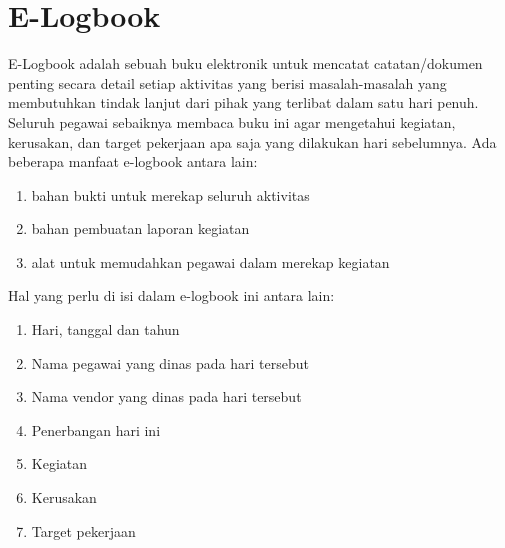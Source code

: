 \section{E-Logbook}
E-Logbook adalah sebuah buku elektronik untuk mencatat catatan/dokumen penting secara detail setiap aktivitas yang berisi masalah-masalah yang membutuhkan tindak lanjut dari pihak yang terlibat dalam satu hari penuh. Seluruh pegawai sebaiknya membaca buku ini agar mengetahui kegiatan, kerusakan, dan target pekerjaan apa saja yang dilakukan hari sebelumnya. Ada beberapa manfaat e-logbook antara lain:
\begin{enumerate}
\item bahan bukti untuk merekap seluruh aktivitas
\item bahan pembuatan laporan kegiatan
\item alat untuk memudahkan pegawai dalam merekap kegiatan
 \end{enumerate}

Hal yang perlu di isi dalam e-logbook ini antara lain:
\begin{enumerate}
\item Hari, tanggal dan tahun
\item Nama pegawai yang dinas pada hari tersebut
\item Nama vendor yang dinas pada hari tersebut
\item Penerbangan hari ini
\item Kegiatan
\item Kerusakan
\item Target pekerjaan
\end{enumerate}